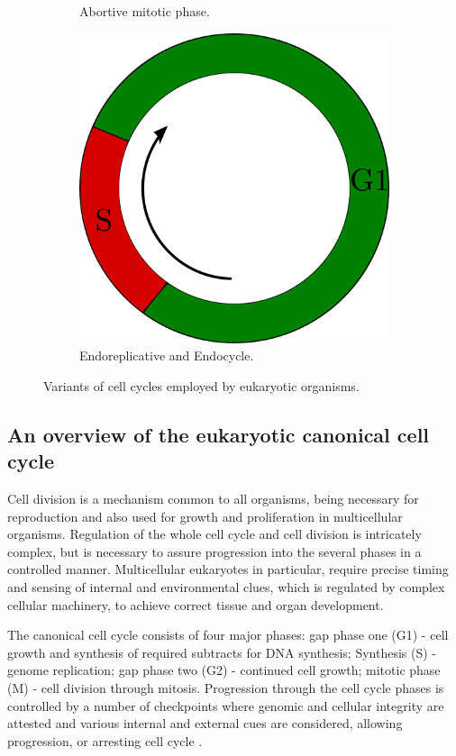 \documentclass[11pt,twoside,a4paper]{report}
\begin{document}
\begin{figure}[here]
\begin{subfigure}{.33\textwidth}
				\caption{Abortive mitotic phase.}
			\end{subfigure}%
			\begin{subfigure}{.33\textwidth}
				\centering
				\includegraphics[width=0.95\linewidth]{pngs/endocycle.png}
				\caption{Endoreplicative and Endocycle.}
			\end{subfigure}%
			\caption[Variants of cell cycles employed by eukaryotic organisms]
			{Variants of cell cycles employed by eukaryotic organisms.}
			\label{fig:cell_cycle_variants}
		\end{figure}
		
			\subsection{An overview of the eukaryotic canonical cell cycle}
			Cell division is a mechanism common to all organisms, being necessary for reproduction and also used for growth and proliferation in multicellular organisms. Regulation of the whole cell cycle and cell division is intricately complex, but is necessary to assure progression into the several phases in a controlled manner. Multicellular eukaryotes in particular, require precise timing and sensing of internal and environmental clues, which is regulated by complex cellular machinery, to achieve correct tissue and organ development.
			
			The canonical cell cycle consists of four major phases: gap phase one (G1) - cell growth and synthesis of required subtracts for DNA synthesis; Synthesis (S) - genome replication; gap phase two (G2) - continued cell growth; mitotic phase (M) - cell division through mitosis. Progression through the cell cycle phases is controlled by a number of checkpoints where genomic and cellular integrity are attested and various internal and external cues are considered, allowing progression, or arresting cell cycle \cite{Sclafani2007}.
			
\end{document}
